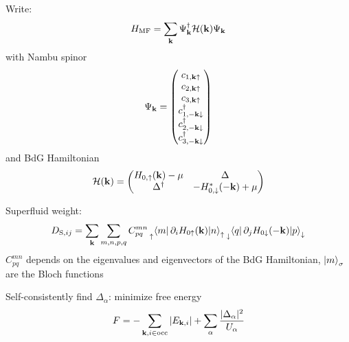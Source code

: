 \documentclass[aspectratio=169]{beamer}
\begin{document}
\begin{frame}
	Write:
	\begin{equation}
		H_{\mathrm{MF}} = \sum_{\mathbf{k}} \Psi_{\mathbf{k}}^{\dagger} \mathcal{H} (\mathbf{k}) \Psi_{\mathbf{k}}
	\end{equation}
	with Nambu spinor
	\begin{equation}
		\Psi_{\mathbf{k}} =
		\begin{pmatrix}
			c_{1, \mathbf{k} \uparrow} \\
			c_{2, \mathbf{k} \uparrow} \\
			c_{3, \mathbf{k} \uparrow} \\
			c_{1, -\mathbf{k} \downarrow}^{\dagger} \\
			c_{2, -\mathbf{k} \downarrow}^{\dagger} \\
			c_{3, -\mathbf{k} \downarrow}^{\dagger} \\
		\end{pmatrix}
	\end{equation}
	and BdG Hamiltonian
	\begin{equation}
		\mathcal{H} (\mathbf{k}) =
		\begin{pmatrix}
			H_{0, \uparrow} (\mathbf{k}) - \mu & \Delta \\
			\Delta^{\dagger} & - H_{0, \downarrow}^* (-\mathbf{k}) + \mu
		\end{pmatrix}
	\end{equation}
\end{frame}

\begin{frame}
	Superfluid weight:
	\begin{equation}
		D_{\mathrm{S}, ij} = \sum_{\vb{k}} \sum_{m,n,p,q} C_{pq}^{mn} 
		\prescript{}{\uparrow}{\braket{m | \pdif{i} H_{0 \uparrow} (\vb{k}) | n}_{\uparrow}} \prescript{}{\downarrow}{\braket{q | \pdif{j} H_{0 \downarrow} (-\vb{k}) | p}_{\downarrow}}
	\end{equation}
	\(C_{pq}^{mn}\) depends on the eigenvalues and eigenvectors of the BdG Hamiltonian, \(\ket{m}_{\sigma}\) are the Bloch functions\pause
	
	Self-consistently find \(\Delta_{\alpha}\): minimize free energy
	\begin{equation}
		F = - \sum_{\mathbf{k}, i\in \mathrm{occ}} \vert E_{\mathbf{k}, i} \vert + \sum_{\alpha} \frac{\vert \Delta_{\alpha} \vert^2}{U_{\alpha}}
	\end{equation}
\end{frame}
\end{document}
